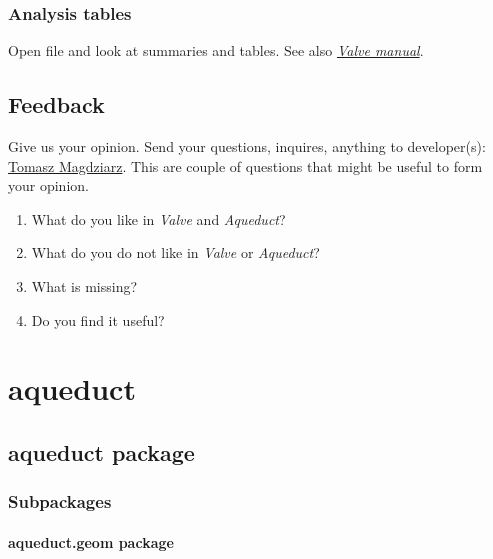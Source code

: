 \documentclass[a4paper,10pt,english]{sphinxmanual}
\begin{document}
\subsection{Analysis tables}
\label{valve/valve_tutorial:analysis-tables}
Open  file and look at summaries and tables. See also {\hyperref[valve/valve_manual::doc]{\emph{Valve manual}}}.


\section{Feedback}
\label{valve/valve_tutorial:feedback}
Give us your opinion. Send your questions, inquires, anything to developer(s): \href{mailto:t.magdziarz@tunnelinggroup.pl}{Tomasz Magdziarz}.
This are couple of questions that might be useful to form your opinion.
\begin{enumerate}
\item {} 
What do you like in \emph{Valve} and \emph{Aqueduct}?

\item {} 
What do you do not like in \emph{Valve} or \emph{Aqueduct}?

\item {} 
What is missing?

\item {} 
Do you find it useful?

\end{enumerate}


\chapter{aqueduct}
\label{modules:aqueduct}\label{modules::doc}

\section{aqueduct package}
\label{aqueduct::doc}\label{aqueduct:aqueduct-package}

\subsection{Subpackages}
\label{aqueduct:subpackages}

\subsubsection{aqueduct.geom package}
\label{aqueduct.geom::doc}\label{aqueduct.geom:aqueduct-geom-package}
\end{document}
